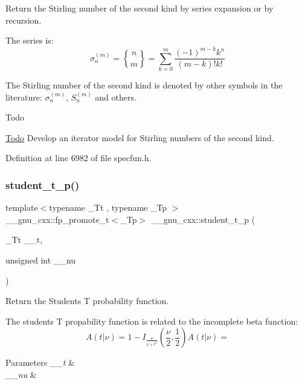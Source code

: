 Return the Stirling number of the second kind by series expansion or by recursion.

The series is\+: \[ \newcommand{\stirling}[2]{\genfrac{\{}{\}}{0pt}{0}{#1}{#2}} \sigma_n^{(m)} = \stirling{n}{m} = \sum_{k=0}^{m}\frac{(-1)^{m-k}k^n}{(m-k)!k!} \]

The Stirling number of the second kind is denoted by other symbols in the literature\+: $ \sigma_n^{(m)} $, $ \textit{S}_n^{(m)} $ and others.

\begin{DoxyRefDesc}{Todo}
\item[\hyperlink{todo__todo000005}{Todo}]Develop an iterator model for Stirling numbers of the second kind. \end{DoxyRefDesc}


Definition at line 6982 of file specfun.\+h.

\mbox{\label{group__gnu__math__spec__func_ga5a84386b009ac57a726d5d0314fdf7ce}} 
\subsubsection{\texorpdfstring{student\+\_\+t\+\_\+p()}{student\_t\_p()}}
{\footnotesize\ttfamily template$<$typename \+\_\+\+Tt , typename \+\_\+\+Tp $>$ \\
\+\_\+\+\_\+gnu\+\_\+cxx\+::fp\+\_\+promote\+\_\+t$<$\+\_\+\+Tp$>$ \+\_\+\+\_\+gnu\+\_\+cxx\+::student\+\_\+t\+\_\+p (\begin{DoxyParamCaption}\item[{\+\_\+\+Tt}]{\+\_\+\+\_\+t,  }\item[{unsigned int}]{\+\_\+\+\_\+nu }\end{DoxyParamCaption})}



Return the Students T probability function. 

The students T propability function is related to the incomplete beta function\+: \[ A(t|\nu) = 1 - I_{\frac{\nu}{\nu + t^2}}(\frac{\nu}{2}, \frac{1}{2}) A(t|\nu) = \]


\begin{DoxyParams}{Parameters}
{\em \+\_\+\+\_\+t} & \\
\hline
{\em \+\_\+\+\_\+nu} & \\
\hline
\end{DoxyParams}


